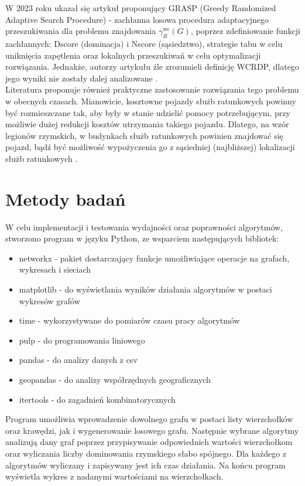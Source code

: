 W 2023 roku ukazał się artykuł proponujący GRASP (Greedy Randomized Adaptive Search Procedure) - zachłanna losowa procedura adaptacyjnego przeszukiwania dla problemu znajdowania $\gamma_{R}^{\text{wc}}(G)$, poprzez zdefiniowanie funkcji zachłannych: Dscore (dominacja) i Nscore (sąsiedztwo), strategie tabu w celu uniknięcia zapętlenia oraz lokalnych przeszukiwań w celu optymalizacji rozwiązania. Jednakże, autorzy artykułu źle zrozumieli definicję WCRDP, dlatego jego wyniki nie zostały dalej analizowane \cite{GRASP}.\\
Literatura proponuje również praktyczne zastosowanie rozwiązania tego problemu w obecnych czasach. Mianowicie, kosztowne pojazdy służb ratunkowych powinny być rozmieszczane tak, aby były w stanie udzielić pomocy potrzebującym, przy możliwie dużej redukcji kosztów utrzymania takiego pojazdu. Dlatego, na wzór legionów rzymskich, w budynkach służb ratunkowych powinien znajdować się pojazd, bądź być możliwość wypożyczenia go z sąsiedniej (najbliższej) lokalizacji służb ratunkowych \cite{improvedILP}.

\section{Metody badań}
W celu implementacji i testowania wydajności oraz poprawności algorytmów, stworzono program w języku Python, ze wsparciem następujących bibliotek:
\begin{itemize}
    \item networkx - pakiet dostarczający funkcje umożliwiające operacje na grafach, wykresach i sieciach
    \item matplotlib - do wyświetlania wyników działania algorytmów w postaci wykresów grafów
    \item time - wykorzystywane do pomiarów czasu pracy algorytmów
    \item pulp - do programowania liniowego
    \item pandas - do analizy danych z csv
    \item geopandas - do analizy współrzędnych geograficznych
    \item itertools - do zagadnień kombinatorycznych
\end{itemize}

Program umożliwia wprowadzenie dowolnego grafu w postaci listy wierzchołków oraz krawędzi, jak i wygenerowanie losowego grafu. Następnie wybrane algorytmy analizują dany graf poprzez przypisywanie odpowiednich wartości wierzchołkom oraz wyliczania liczby dominowania rzymskiego słabo spójnego. Dla każdego z algorytmów wyliczany i zapisywany jest ich czas działania. Na końcu program wyświetla wykres z nadanymi wartościami na wierzchołkach.\\

